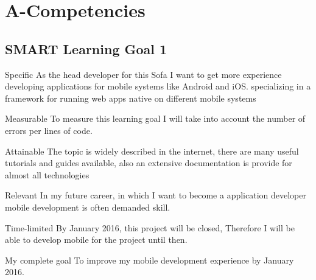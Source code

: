 \documentclass[12pt]{article}
\begin{document}
    \section{A-Competencies}
    
    \subsection{SMART Learning Goal 1}
\begin{SMART}
    \item[Specific] As the head developer for this Sofa I want to get more experience developing applications for mobile systems like Android and iOS. specializing in a framework for running web apps native on different mobile systems
    \item[Measurable] To measure this learning goal I will take into account the number of errors per lines of code.
    \item[Attainable] The topic is widely described in the internet, there are many useful tutorials and guides available, also an extensive documentation is provide for almost all technologies
    \item[Relevant] In my future career, in which I want to become a application developer mobile development is often demanded skill.
    \item[Time-limited] By January 2016, this project will be closed, Therefore I will be able to develop mobile for the project until then.
    \item[My complete goal] To improve my mobile development experience by January 2016.
\end{SMART}
\end{document}
